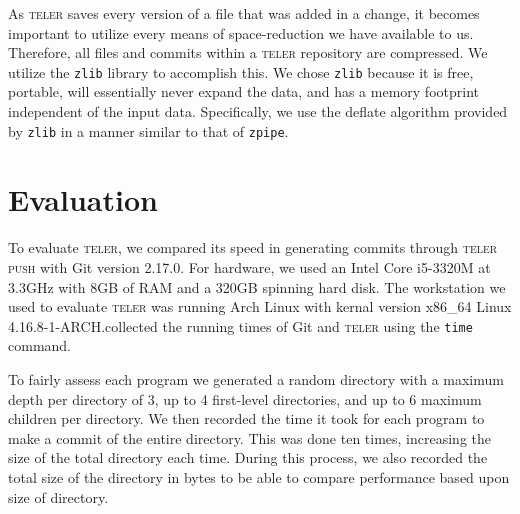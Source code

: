 \documentclass[12pt, letterpaper]{article}
\begin{document}
\begin{multicols}{2}
  As \textsc{teler} saves every version of a file that was added in a
  change, it becomes important to utilize every means of
  space-reduction we have available to us. Therefore, all files and
  commits within a \textsc{teler} repository are compressed. We
  utilize the \texttt{zlib} library to accomplish this. We chose
  \texttt{zlib} because it is free, portable, will essentially never
  expand the data, and has a memory footprint independent of the
  input data. Specifically, we use the deflate algorithm provided by
  \texttt{zlib} in a manner similar to that of \texttt{zpipe}.

  \section{Evaluation}
  \label{sec:evaluation}
  To evaluate \textsc{teler}, we compared its speed in generating
  commits through \textsc{teler push} with Git version 2.17.0. For
  hardware, we used an Intel Core i5-3320M at 3.3GHz with 8GB of RAM
  and a 320GB spinning hard disk. The workstation we used to evaluate
  \textsc{teler} was running Arch Linux with kernal version x86\_64
  Linux 4.16.8-1-ARCH.\@We collected the running times of Git and
  \textsc{teler} using the \texttt{time} command.

  To fairly assess each program we generated a random directory with a
  maximum depth per directory of 3, up to 4 first-level directories,
  and up to 6 maximum children per directory. We then recorded the
  time it took for each program to make a commit of the entire
  directory. This was done ten times, increasing the size of the total
  directory each time. During this process, we also recorded the total
  size of the directory in bytes to be able to compare performance
  based upon size of directory.



\end{multicols}
\end{document}
